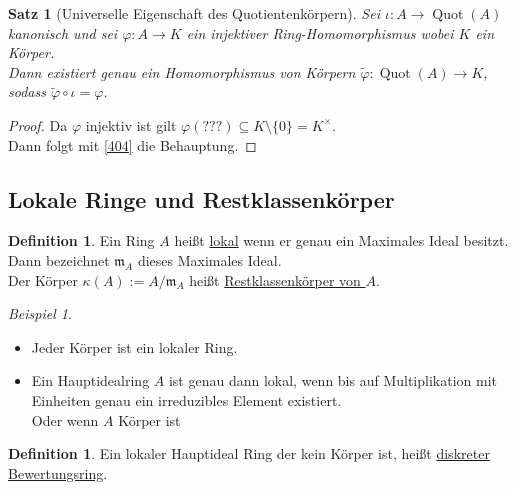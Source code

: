 \documentclass[10pt,a4paper]{article}
\newcommand{\Quot}{\operatorname{Quot}}
\newcounter{thm}[section]
\theoremstyle{definition}
\newtheorem{definition}[thm]{Definition}
\theoremstyle{plain}
\newtheorem{satz}[thm]{Satz}
\theoremstyle{remark}
\newtheorem{exm}[thm]{Beispiel}
\begin{document}
\begin{satz}[Universelle Eigenschaft des Quotientenkörpern]
	Sei $\iota:A\rightarrow \Quot(A)$ kanonisch und sei $\varphi:A\rightarrow K$ ein injektiver Ring-Homomorphismus wobei $K$ ein Körper.\\
	Dann existiert genau ein Homomorphismus von Körpern $\tilde{\varphi}:\Quot(A)\rightarrow K$, sodass $\tilde{\varphi}\circ\iota=\varphi$.
	\begin{center}
	\end{center}
\end{satz}
\begin{proof}
	Da $\varphi$ injektiv ist gilt $\varphi(???)\subseteq K\setminus\{0\}=K^\times$.\\ %
	Dann folgt mit \ref{404} die Behauptung.
\end{proof}






\subsection{Lokale Ringe und Restklassenkörper}
\begin{definition}
	Ein Ring $A$ heißt \underline{lokal} wenn er genau ein Maximales Ideal besitzt.\\
	Dann bezeichnet $\mathfrak m_A$ dieses Maximales Ideal.\\
	Der Körper $\kappa(A):=A/\mathfrak m_A$ heißt \underline{Restklassenkörper von $A$}.
\end{definition}

\begin{exm}
	\begin{itemize}
		\item Jeder Körper ist ein lokaler Ring.
		\item Ein Hauptidealring $A$ ist genau dann lokal, wenn bis auf Multiplikation mit Einheiten genau ein irreduzibles Element existiert.\\
		Oder wenn $A$ Körper ist
	\end{itemize}
\end{exm}

\begin{definition}
	Ein lokaler Hauptideal Ring der kein Körper ist, heißt \underline{diskreter Bewertungsring}.
\end{definition}
\end{document}
